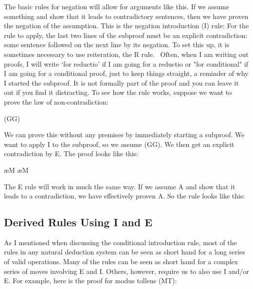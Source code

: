 The basic rules for negation will allow for arguments like this. If we assume something and show that it leads to contradictory sentences, then we have proven the negation of the assumption. This is the negation introduction (\enot I) rule:
For the rule to apply, the last two lines of the subproof must be an explicit contradiction: some sentence followed on the next line by its negation. To set this up, it is sometimes necessary to use reiteration, the R rule.  Often, when I am writing out proofs, I will write ‘for reductio’ if I am going for a reductio or "for conditional" if I am going for a conditional proof, just to keep things straight, a reminder of why I started the subproof. It is not formally part of the proof and you can leave it out if you find it distracting. To see how the rule works, suppose we want to prove the law of non-contradiction:
\begin{center}
\enot (G\eand \enot G)
\end{center}
We can prove this without any premises by immediately starting a subproof. We want to apply \enot I to the subproof, so we assume (G\eand \enot G). We then get an explicit contradiction by \eand E. The proof looks like this:
\begin{fitchproof}
\open
	 \ae{M}
	 \ae{M}
\close
{} 
\end{fitchproof}

The \enot E rule will work in much the same way. If we assume \enot A and show that it leads to a contradiction, we have effectively proven A. So the rule looks like this:

\subsection{Derived Rules Using \enot I and \enot E}

As I mentioned when discussing the conditional introduction rule, most of the rules in any natural deduction system can be seen as short hand for a long series of valid operations. Many of the rules can be seen as short hand for a complex series of moves involving \eif E and \eif I. Others, however, require us to also use \enot I and/or \enot E. For example, here is the proof for modus tollens (MT):
\begin{fitchproof}
\open
	 
	 
\close
{} 
\end{fitchproof}

